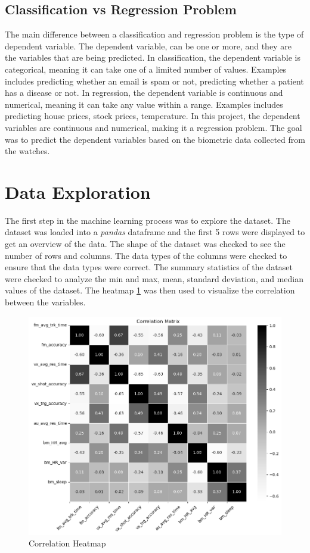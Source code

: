 \subsection*{Classification vs Regression Problem}
The main difference between a classification and regression problem is the type of dependent variable. The dependent variable, can be one or more, and they are the variables that are being predicted. In
classification, the dependent variable is categorical, meaning it can take one of a limited number of values. Examples includes predicting whether an email is spam or not,
predicting whether a patient has a disease or not. In regression, the dependent variable is continuous and numerical, meaning it can take any value within a range. Examples
includes predicting house prices, stock prices, temperature. In this project, the dependent variables are continuous and numerical, making it a regression problem. The goal
was to predict the dependent variables based on the biometric data collected from the watches.

\section{Data Exploration}
The first step in the machine learning process was to explore the dataset. The dataset was loaded into a \textit{pandas} dataframe and the first 5 rows were displayed to get an overview of the
data. The shape of the dataset was checked to see the number of rows and columns. The data types of the columns were checked to ensure that the data types were correct. The summary
statistics of the dataset were checked to analyze the min and max, mean, standard deviation, and median values of the dataset. The heatmap \ref{fig:correlation_heatmap} was then used to
visualize the correlation between the variables.

\begin{figure}[H]
    \centering
    \includegraphics[width=1\textwidth]{images/regressionCharts/corr_matrix.png}
    \caption{Correlation Heatmap}
    \label{fig:correlation_heatmap}
\end{figure}

